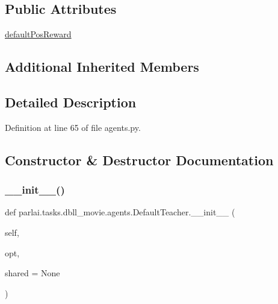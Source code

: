 \subsection*{Public Attributes}
\begin{DoxyCompactItemize}
\item 
\hyperlink{classparlai_1_1tasks_1_1dbll__movie_1_1agents_1_1DefaultTeacher_a8349f6694fcf25ac83d5f0972d99fede}{default\+Pos\+Reward}
\end{DoxyCompactItemize}
\subsection*{Additional Inherited Members}


\subsection{Detailed Description}


Definition at line 65 of file agents.\+py.



\subsection{Constructor \& Destructor Documentation}
\mbox{\label{classparlai_1_1tasks_1_1dbll__movie_1_1agents_1_1DefaultTeacher_a66c1dbd7bb3e1b49e3c145235f1fffa0}} 
\subsubsection{\texorpdfstring{\+\_\+\+\_\+init\+\_\+\+\_\+()}{\_\_init\_\_()}}
{\footnotesize\ttfamily def parlai.\+tasks.\+dbll\+\_\+movie.\+agents.\+Default\+Teacher.\+\_\+\+\_\+init\+\_\+\+\_\+ (\begin{DoxyParamCaption}\item[{}]{self,  }\item[{}]{opt,  }\item[{}]{shared = {\ttfamily None} }\end{DoxyParamCaption})}



